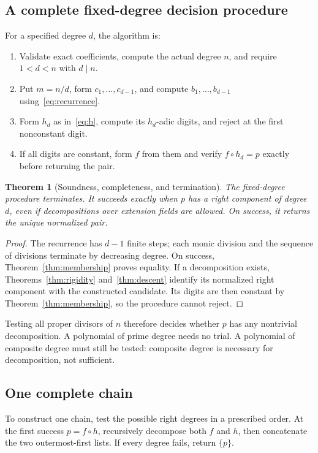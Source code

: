 \documentclass[11pt,letterpaper]{article}
\newtheorem{theorem}{Theorem}[section]
\theoremstyle{definition}
\theoremstyle{remark}
\begin{document}
\subsection{A complete fixed-degree decision procedure}
For a specified degree $d$, the algorithm is:
\begin{enumerate}
\item Validate exact coefficients, compute the actual degree $n$, and require
$1<d<n$ with $d\mid n$.
\item Put $m=n/d$, form $c_1,\ldots,c_{d-1}$, and compute
$b_1,\ldots,b_{d-1}$ using~\eqref{eq:recurrence}.
\item Form $h_d$ as in~\eqref{eq:h}, compute its $h_d$-adic digits,
and reject at the first nonconstant digit.
\item If all digits are constant, form $f$ from them and verify
$f\circ h_d=p$ exactly before returning the pair.
\end{enumerate}

\begin{theorem}[Soundness, completeness, and termination]\label{thm:fixed}
The fixed-degree procedure terminates. It succeeds exactly when $p$ has
a right component of degree $d$, even if decompositions over extension
fields are allowed. On success, it returns the unique normalized pair.
\end{theorem}

\begin{proof}
The recurrence has $d-1$ finite steps; each monic division and the
sequence of divisions terminate by decreasing degree. On success,
Theorem~\ref{thm:membership} proves equality. If a decomposition exists,
Theorems~\ref{thm:rigidity} and~\ref{thm:descent} identify its normalized
right component with the constructed candidate. Its digits are then
constant by Theorem~\ref{thm:membership}, so the procedure cannot reject.
\end{proof}

Testing all proper divisors of $n$ therefore decides whether $p$ has any
nontrivial decomposition. A polynomial of prime degree needs no trial.
A polynomial of composite degree must still be tested: composite degree
is necessary for decomposition, not sufficient.

\subsection{One complete chain}
To construct one chain, test the possible right degrees in a prescribed
order. At the first success $p=f\circ h$, recursively decompose both
$f$ and $h$, then concatenate the two outermost-first lists. If every
degree fails, return $\{p\}$.
\end{document}
